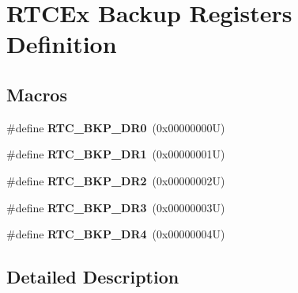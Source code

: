 \hypertarget{group___r_t_c_ex___backup___registers___definitions}{}\section{R\+T\+C\+Ex Backup Registers Definition}
\label{group___r_t_c_ex___backup___registers___definitions}
\subsection*{Macros}
\begin{DoxyCompactItemize}
\item 
\mbox{\label{group___r_t_c_ex___backup___registers___definitions_ga519bec4c7714e123cf2664f7394dc1ab}} 
\#define {\bfseries R\+T\+C\+\_\+\+B\+K\+P\+\_\+\+D\+R0}~(0x00000000\+U)
\item 
\mbox{\label{group___r_t_c_ex___backup___registers___definitions_ga6988b61b031e1407787095b0ff214ea8}} 
\#define {\bfseries R\+T\+C\+\_\+\+B\+K\+P\+\_\+\+D\+R1}~(0x00000001\+U)
\item 
\mbox{\label{group___r_t_c_ex___backup___registers___definitions_ga09963fdfb90ed5b7e32db13671447abb}} 
\#define {\bfseries R\+T\+C\+\_\+\+B\+K\+P\+\_\+\+D\+R2}~(0x00000002\+U)
\item 
\mbox{\label{group___r_t_c_ex___backup___registers___definitions_ga014a39228ba4783b62ac8f11929ecd6a}} 
\#define {\bfseries R\+T\+C\+\_\+\+B\+K\+P\+\_\+\+D\+R3}~(0x00000003\+U)
\item 
\mbox{\label{group___r_t_c_ex___backup___registers___definitions_ga97545ebe0827a8650f953c371368f3f5}} 
\#define {\bfseries R\+T\+C\+\_\+\+B\+K\+P\+\_\+\+D\+R4}~(0x00000004\+U)
\end{DoxyCompactItemize}


\subsection{Detailed Description}
